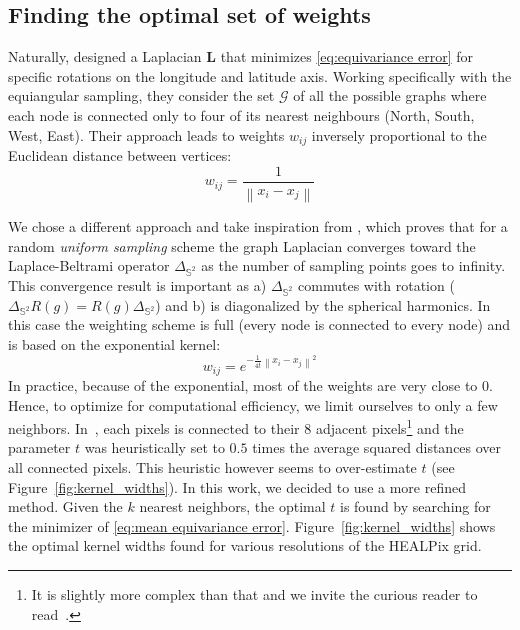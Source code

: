 \documentclass{article} %
\newcommand{\norm}[1]{\left\lVert#1\right\rVert}
\renewcommand{\b}[1]{{\bm{#1}}}  %
\newcommand{\Figref}[1]{Figure~\ref{fig:#1}}
\begin{document}
\subsection{Finding the optimal set of weights}  \label{sec:optimal}
Naturally, \citet{khasanova2017sphericalcnn} designed a Laplacian $\b{L}$ that minimizes \eqref{eq:equivariance error} for specific rotations on the longitude and latitude axis.
Working specifically with the equiangular sampling, they consider the set $\mathcal{G}$ of all the possible graphs where each node is connected only to four of its nearest neighbours (North, South, West, East).
Their approach leads to weights $w_{ij}$ inversely proportional to the Euclidean distance between vertices:
\begin{equation} \label{eqn:weights:khasanova}
	w_{ij} = \frac{1}{\norm{x_i-x_j}}
\end{equation}

We chose a different approach and take inspiration from \citet{belkin2005towards}, which proves that for a random \emph{uniform sampling} scheme the graph Laplacian converges toward the Laplace-Beltrami operator $\Delta_{\mathbb{S}^2}$ as the number of sampling points goes to infinity.
This convergence result is important as a) $\Delta_{\mathbb{S}^2}$ commutes with rotation ($\Delta_{\mathbb{S}^2}R(g) = R(g)\Delta_{\mathbb{S}^2}$) and b) is diagonalized by the spherical harmonics.
In this case the weighting scheme is full (every node is connected to every node) and is based on the exponential kernel:
\begin{equation} \label{eqn:weights:belkin}
w_{ij} = e^{-\frac{1}{4t} \norm{x_i-x_j}^2}
\end{equation}
In practice, because of the exponential, most of the weights are very close to $0$. Hence, to optimize for computational efficiency, we limit ourselves to only a few neighbors.
In~\cite{perraudin2019deepspherecosmo}, each pixels is connected to their 8 adjacent pixels\footnote{It is slightly more complex than that and we invite the curious reader to read~\cite{perraudin2019deepspherecosmo}.} and the parameter $t$ was heuristically set to $0.5$ times the average squared distances over all connected pixels.
This heuristic however seems to over-estimate $t$ (see \Figref{kernel_widths}). 
In this work, we decided to use a more refined method.
Given the $k$ nearest neighbors, the optimal $t$ is found by searching for the minimizer of \eqref{eq:mean equivariance error}.
\Figref{kernel_widths} shows the optimal kernel widths found for various resolutions of the HEALPix grid. 
\end{document}
